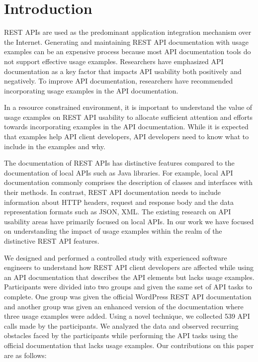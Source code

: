 \documentclass[conference]{IEEEtran}
\begin{document}
\IEEEpeerreviewmaketitle


\section{Introduction}
REST APIs are used as the predominant application integration mechanism over the Internet. Generating and maintaining REST API documentation with usage examples can be an expensive process because most API documentation tools do not support effective usage examples. Researchers have emphasized API documentation as a key factor that impacts API usability both positively and negatively. To improve API documentation, researchers have recommended incorporating usage examples in the API documentation.

In a resource constrained environment, it is important to understand the value of usage examples on REST API usability to allocate sufficient attention and efforts towards incorporating examples in the API documentation. While it is expected that examples help API client developers, API developers need to know what to include in the examples and why.

The documentation of REST APIs has distinctive features compared to the documentation of local APIs such as Java libraries. For example, local API documentation commonly comprises the description of classes and interfaces with their methods. In contrast, REST API documentation needs to include information about HTTP headers, request and response body and the data representation formats such as JSON, XML. The existing research on API usability areas have primarily focused on local APIs. In our work we have focused on understanding the impact of usage examples within the realm of the distinctive REST API features.

We designed and performed a controlled study with experienced software engineers to understand how REST API client developers are affected while using an API documentation that describes the API elements but lacks usage examples. Participants were divided into two groups and given the same set of API tasks to complete. One group was given the official WordPress REST API documentation and another group was given an enhanced version of the documentation where three usage examples were added. Using a novel technique, we collected 539 API calls made by the participants. We analyzed the data and observed recurring obstacles faced by the participants while performing the API tasks using the official documentation that lacks usage examples. Our contributions on this paper are as follows:
\end{document}

